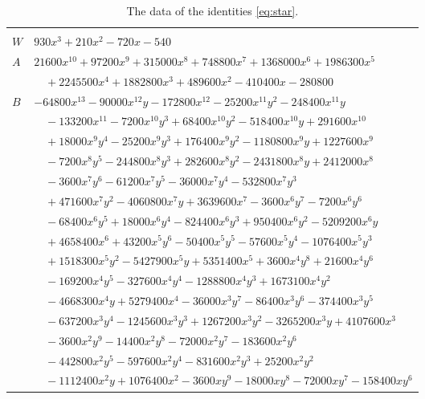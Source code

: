 \documentclass[11pt]{article}
\begin{document}
\clearpage
\begingroup\footnotesize
\setlength{\LTcapwidth}{\textwidth}
\begin{longtable}{@{}ll@{}}
\caption{The data of the identities \eqref{eq:star}.}\label{tab:star}\\
\hline\endfirsthead\hline\endhead\hline\endfoot
\multicolumn{2}{@{}l}{$i=0$, $m=4$, neighbours $1,3,4,6,23,87,185$}\\
$W$ & $930x^{3}+210x^{2}-720x-540$\\
$A$ & $21600x^{10}+97200x^{9}+315000x^{8}+748800x^{7}+1368000x^{6}+1986300x^{5}$\\
 & $\quad +2245500x^{4}+1882800x^{3}+489600x^{2}-410400x-280800$\\
$B$ & $-64800x^{13}-90000x^{12}y-172800x^{12}-25200x^{11}y^{2}-248400x^{11}y$\\
 & $\quad -133200x^{11}-7200x^{10}y^{3}+68400x^{10}y^{2}-518400x^{10}y+291600x^{10}$\\
 & $\quad +18000x^{9}y^{4}-25200x^{9}y^{3}+176400x^{9}y^{2}-1180800x^{9}y+1227600x^{9}$\\
 & $\quad -7200x^{8}y^{5}-244800x^{8}y^{3}+282600x^{8}y^{2}-2431800x^{8}y+2412000x^{8}$\\
 & $\quad -3600x^{7}y^{6}-61200x^{7}y^{5}-36000x^{7}y^{4}-532800x^{7}y^{3}$\\
 & $\quad +471600x^{7}y^{2}-4060800x^{7}y+3639600x^{7}-3600x^{6}y^{7}-7200x^{6}y^{6}$\\
 & $\quad -68400x^{6}y^{5}+18000x^{6}y^{4}-824400x^{6}y^{3}+950400x^{6}y^{2}-5209200x^{6}y$\\
 & $\quad +4658400x^{6}+43200x^{5}y^{6}-50400x^{5}y^{5}-57600x^{5}y^{4}-1076400x^{5}y^{3}$\\
 & $\quad +1518300x^{5}y^{2}-5427900x^{5}y+5351400x^{5}+3600x^{4}y^{8}+21600x^{4}y^{6}$\\
 & $\quad -169200x^{4}y^{5}-327600x^{4}y^{4}-1288800x^{4}y^{3}+1673100x^{4}y^{2}$\\
 & $\quad -4668300x^{4}y+5279400x^{4}-36000x^{3}y^{7}-86400x^{3}y^{6}-374400x^{3}y^{5}$\\
 & $\quad -637200x^{3}y^{4}-1245600x^{3}y^{3}+1267200x^{3}y^{2}-3265200x^{3}y+4107600x^{3}$\\
 & $\quad -3600x^{2}y^{9}-14400x^{2}y^{8}-72000x^{2}y^{7}-183600x^{2}y^{6}$\\
 & $\quad -442800x^{2}y^{5}-597600x^{2}y^{4}-831600x^{2}y^{3}+25200x^{2}y^{2}$\\
 & $\quad -1112400x^{2}y+1076400x^{2}-3600xy^{9}-18000xy^{8}-72000xy^{7}-158400xy^{6}$\\

\end{longtable}
\end{document}
